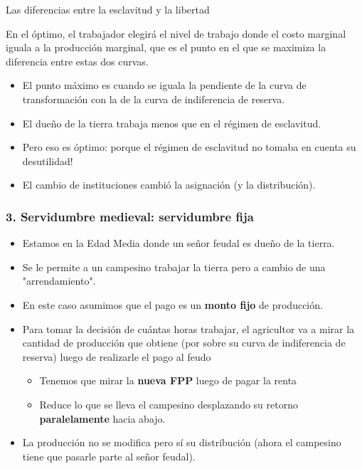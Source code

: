 \documentclass{beamer}
\begin{document}
\begin{frame}{Las diferencias entre la esclavitud y la libertad}
        \begin{boxB}
        \centering
        En el óptimo, el trabajador elegirá el nivel de trabajo donde el costo marginal iguala a la producción marginal, que es el punto en el que se maximiza la diferencia entre estas dos curvas.
        \end{boxB}
        \begin{itemize}
        \item El punto máximo es cuando se iguala la pendiente de la curva de transformación con la de la curva de indiferencia de reserva. 
        \item El dueño de la tierra trabaja menos que en el régimen de esclavitud.
        \item Pero eso es óptimo: porque el régimen de esclavitud no tomaba en cuenta su desutilidad!
        \item El cambio de instituciones cambió la asignación (y la distribución).
    \end{itemize}
\end{frame}


\begin{frame}
\frametitle{3. Servidumbre medieval: servidumbre fija }
\begin{itemize}
    \item Estamos en la Edad Media donde un señor feudal es dueño de la tierra. 
    \item Se le permite a un campesino trabajar la tierra pero a cambio de una "arrendamiento". 
    \item  En este caso asumimos que el pago es un \textbf{monto fijo} de producción. \vspace{1mm}
    \item Para tomar la decisión de cuántas horas trabajar, el agricultor va a mirar la cantidad de producción que obtiene (por sobre su curva de indiferencia de reserva) luego de realizarle el pago al feudo \vspace{1mm}
        \begin{itemize}
        \item Tenemos que mirar la \textbf{nueva FPP} luego de pagar la renta
        \item Reduce lo que se lleva el campesino desplazando su retorno \textbf{paralelamente} hacia abajo. \vspace{1mm}
        \end{itemize}
    \item La producción no se modifica pero sí su distribución (ahora el campesino tiene que pasarle parte al señor feudal). 
\end{itemize}
\end{frame}
\end{document}
